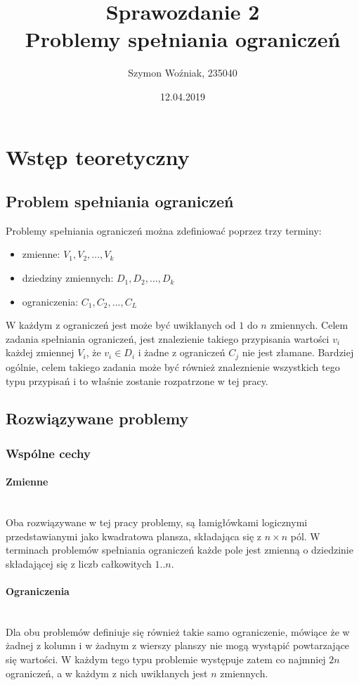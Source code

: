 \documentclass{article}
\author{Szymon Woźniak, 235040}
\date{12.04.2019}
\title{Sprawozdanie 2\\Problemy spełniania ograniczeń}
\begin{document}
	\maketitle
	\newpage
	
	\section{Wstęp teoretyczny}
	\subsection{Problem spełniania ograniczeń}
	Problemy spełniania ograniczeń można zdefiniować poprzez trzy terminy: 
	\begin{itemize}
		\item zmienne: $V_{1}, V_{2}, ..., V_{k}$
		\item dziedziny zmiennych: $D_{1}, D_{2}, ..., D_{k}$
		\item ograniczenia: $C_{1}, C_{2}, ..., C_{L}$
	\end{itemize}
	W każdym z ograniczeń jest może być uwikłanych od $1$ do $n$ zmiennych.
	Celem zadania spełniania ograniczeń, jest znalezienie takiego przypisania wartości $v_i$ każdej zmiennej $V_i$, że $v_i \in D_i$ i żadne z ograniczeń $C_j$ nie jest złamane.
	Bardziej ogólnie, celem takiego zadania może być również znaleznienie wszystkich tego typu przypisań i to właśnie zostanie rozpatrzone w tej pracy.
	\subsection{Rozwiązywane problemy}
	\subsubsection{Wspólne cechy}
	\paragraph{Zmienne}\mbox{}\\
	Oba rozwiązywane w tej pracy problemy, są łamigłówkami logicznymi przedstawianymi jako kwadratowa plansza, składająca się z $n \times n$ pól. W terminach problemów spełniania ograniczeń każde pole jest zmienną o dziedzinie składającej się z liczb całkowitych $1..n$.
	\paragraph{Ograniczenia}\mbox{}\\
	Dla obu problemów definiuje się również takie samo ograniczenie, mówiące że w żadnej z kolumn i w żadnym z wierszy planszy nie mogą wystąpić powtarzające się wartości. W każdym tego typu problemie występuje zatem co najmniej $2n$ ograniczeń, a w każdym z nich uwikłanych jest $n$ zmiennych.
	
\end{document}
